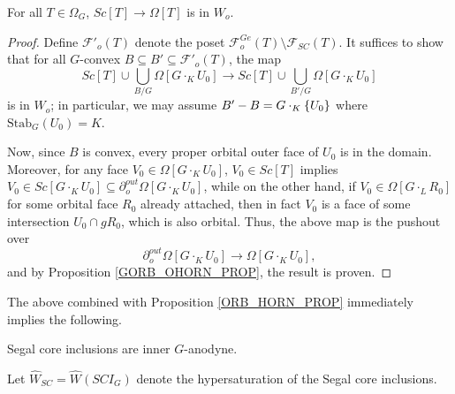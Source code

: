 \documentclass[a4paper,10pt,draft]{article}%
\begin{document}
\begin{proposition}
      \label{SC_IN_OHORN_PROP}
      For all $T \in \Omega_G$, $Sc[T] \to \Omega[T]$ is in $W_o$. 
\end{proposition}
\begin{proof}
      Define $\mathscr{F}'_{o}(T)$ denote the poset %
      $\mathscr{F}_{o}^{G e}(T) \setminus \mathscr{F}_{SC}(T)$.
      It suffices to show that for all $G$-convex $B \subseteq B' \subseteq \mathscr{F}'_o(T)$, the map
      \begin{equation}
            Sc[T] \cup \mathop{\bigcup}\limits_{B/G}\Omega[G \cdot_K U_0]
            \to
            Sc[T] \cup \mathop{\bigcup}\limits_{B'/G}\Omega[G \cdot_K U_0]
      \end{equation}
      is in $W_o$; in particular, we may assume $B' - B = G \cdot_K \left\{U_0\right\}$ where $\mathrm{Stab}_G(U_0) = K$.

      Now, since $B$ is convex, every proper orbital outer face of $U_0$ is in the domain.
      Moreover, for any face $V_0 \in \Omega[G \cdot_K U_0]$,
      $V_0 \in Sc[T]$ implies
      $V_0 \in Sc[G \cdot_K U_0] \subseteq \partial^{out}_o\Omega[G \cdot_K U_0]$,
      while on the other hand,
      if $V_0 \in \Omega[G \cdot_L R_0]$ for some orbital face $R_0$ already attached,
      then in fact $V_0$ is a face of some intersection $U_0 \cap g R_0$,
      which is also orbital.
      Thus, the above map is the pushout over
      \begin{equation}
            \partial^{out}_o\Omega[G \cdot_K U_0] \to \Omega[G \cdot_K U_0],
      \end{equation}
      and by Proposition \ref{GORB_OHORN_PROP}, the result is proven.
\end{proof}

The above combined with Proposition \ref{ORB_HORN_PROP} immediately implies the following.
\begin{corollary}
      Segal core inclusions are inner $G$-anodyne.
\end{corollary}


\begin{definition}
      Let $\hat{W}_{SC} = \hat{W}(SCI_G)$ denote the hypersaturation of the Segal core inclusions.
\end{definition}

\end{document}
